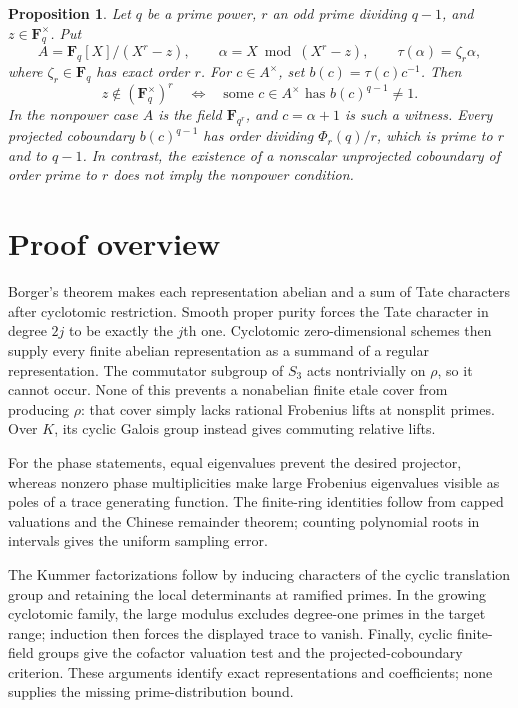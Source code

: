 \documentclass[11pt]{article}
\newtheorem{proposition}[theorem]{Proposition}
\theoremstyle{remark}\newtheorem{remark}[theorem]{Remark}
\begin{document}
\begin{proposition}\label{prop:cofactor-algebra}
Let $q$ be a prime power, $r$ an odd prime dividing $q-1$, and $z\in\mathbf F_q^\times$. Put
\[
 A=\mathbf F_q[X]/(X^r-z),\qquad
 \alpha=X\bmod(X^r-z),\qquad \tau(\alpha)=\zeta_r\alpha,
\]
where $\zeta_r\in\mathbf F_q$ has exact order $r$. For $c\in A^\times$, set $b(c)=\tau(c)c^{-1}$. Then
\[
 z\notin(\mathbf F_q^\times)^r
 \quad\Longleftrightarrow\quad
 \text{some }c\in A^\times\text{ has }b(c)^{q-1}\ne1.
\]
In the nonpower case $A$ is the field $\mathbf F_{q^r}$, and $c=\alpha+1$ is such a witness. Every projected coboundary $b(c)^{q-1}$ has order dividing $\Phi_r(q)/r$, which is prime to $r$ and to $q-1$. In contrast, the existence of a nonscalar unprojected coboundary of order prime to $r$ does not imply the nonpower condition.
\end{proposition}

\section*{Proof overview}
Borger's theorem makes each representation abelian and a sum of Tate characters after cyclotomic restriction. Smooth proper purity forces the Tate character in degree $2j$ to be exactly the $j$th one. Cyclotomic zero-dimensional schemes then supply every finite abelian representation as a summand of a regular representation. The commutator subgroup of $S_3$ acts nontrivially on $\rho$, so it cannot occur. None of this prevents a nonabelian finite etale cover from producing $\rho$: that cover simply lacks rational Frobenius lifts at nonsplit primes. Over $K$, its cyclic Galois group instead gives commuting relative lifts.


For the phase statements, equal eigenvalues prevent the desired
projector, whereas nonzero phase multiplicities make large Frobenius
eigenvalues visible as poles of a trace generating function. The
finite-ring identities follow from capped valuations and the Chinese
remainder theorem; counting polynomial roots in intervals gives the
uniform sampling error.

The Kummer factorizations follow by inducing characters of the cyclic
translation group and retaining the local determinants at ramified
primes. In the growing cyclotomic family, the large modulus excludes
degree-one primes in the target range; induction then forces the
displayed trace to vanish. Finally, cyclic finite-field groups give
the cofactor valuation test and the projected-coboundary criterion.
These arguments identify exact representations and coefficients;
none supplies the missing prime-distribution bound.
\end{document}
